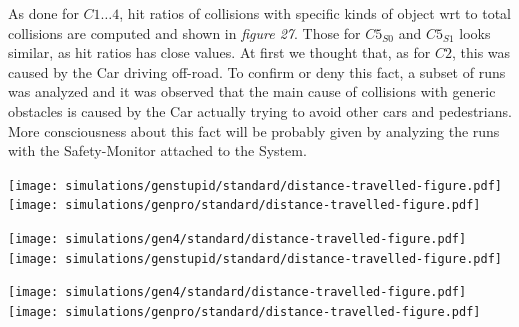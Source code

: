 As done for $C1\dots 4$, hit ratios of collisions with specific kinds of object wrt to total collisions are computed and shown in \textsl{figure 27}. Those for $C5_{S0}$ and $C5_{S1}$ looks similar, as hit ratios has close values. At first we thought that, as for $C2$, this was caused by the Car driving off-road. To confirm or deny this fact, a subset of runs was analyzed and it was observed that the main cause of collisions with generic obstacles is caused by the Car actually trying to avoid other cars and pedestrians. More consciousness about this fact will be probably given by analyzing the runs with the Safety-Monitor attached to the System.

\begin{minipage}[c]{\textwidth}
	\texttt{[image: simulations/genstupid/standard/distance-travelled-figure.pdf]}
	\vspace{0.5cm}
	\texttt{[image: simulations/genpro/standard/distance-travelled-figure.pdf]}
\end{minipage}

\begin{minipage}[c]{\textwidth}
	\texttt{[image: simulations/gen4/standard/distance-travelled-figure.pdf]}
	\vspace{0.5cm}
	\texttt{[image: simulations/genstupid/standard/distance-travelled-figure.pdf]}
\end{minipage}

\begin{minipage}[c]{\textwidth}
	\texttt{[image: simulations/gen4/standard/distance-travelled-figure.pdf]}
	\vspace{0.5cm}
	\texttt{[image: simulations/genpro/standard/distance-travelled-figure.pdf]}
\end{minipage}

